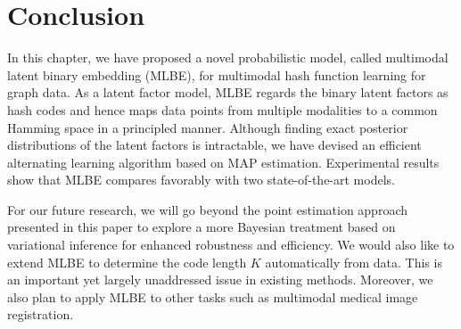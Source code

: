 \section{Conclusion}
\label{mlbe:conclusion}

In this chapter, we have proposed a novel probabilistic model, called multimodal latent binary embedding (MLBE), for multimodal hash function learning for graph data.  As a latent factor model, MLBE regards the binary latent factors as hash codes and hence maps data points from multiple modalities to a common Hamming space in a principled manner.  Although finding exact posterior distributions of the latent factors is intractable, we have devised an efficient alternating learning algorithm based on \mbox{MAP} estimation. Experimental results show that MLBE compares favorably with two state-of-the-art models. 

For our future research, we will go beyond the point estimation approach presented in this paper to explore a more Bayesian treatment based on variational inference for enhanced robustness and efficiency. We would also like to extend \mbox{MLBE} to determine the code length $K$ automatically from data.  This is an important yet largely unaddressed issue in existing methods. Moreover, we also plan to apply \mbox{MLBE} to other tasks such as multimodal medical image registration.

